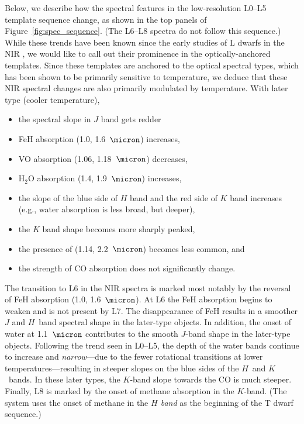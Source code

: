 \documentclass[12pt,preprint]{aastex}
\begin{document}
Below, we describe how the spectral features in the low-resolution L0--L5 template sequence change, as shown in the top panels of Figure~\ref{fig:spec_sequence}. (The L6--L8 spectra do not follow this sequence.)
While these trends have been known since the early studies of L dwarfs in the NIR \citep{Testi01,Reid01_NIR,Geballe02}, we would like to call out their prominence in the optically-anchored templates.
Since these templates are anchored to the optical spectral types, which has been shown to be primarily sensitive to temperature, we deduce that these NIR spectral changes are also primarily modulated by temperature.
With later type (cooler temperature), 
\begin{itemize}
\item the spectral slope in $J$ band gets redder 
\item FeH absorption (1.0, 1.6~$\micron$) increases,
\item VO absorption (1.06, 1.18~$\micron$) decreases,
\item H$_2$O absorption (1.4, 1.9~$\micron$) increases,
\item the slope of the blue side of $H$ band and the red side of $K$ band increases (e.g., water absorption is less broad, but deeper), 
\item the $K$ band shape becomes more sharply peaked,
\item the presence of  (1.14, 2.2~$\micron$) becomes less common, and
\item the strength of CO absorption does not significantly change.
\end{itemize}

The transition to L6 in the NIR spectra is marked most notably by the reversal of FeH absorption (1.0, 1.6~$\micron$). 
At L6 the FeH absorption begins to weaken and is not present by L7. 
The disappearance of FeH results in a smoother $J$ and $H$~band spectral shape in the later-type objects. In addition, the onset of water at 1.1~$\micron$ contributes to the smooth $J$-band shape in the later-type objects. Following the trend seen in L0--L5, the depth of the water bands continue to increase and \emph{narrow}---due to the fewer rotational transitions at lower temperatures---resulting in steeper slopes on the blue sides of the $H$~and $K$~bands. 
In these later types, the $K$-band slope towards the CO is much steeper. 
Finally, L8 is marked by the onset of methane absorption in the $K$-band. 
(The \citet{Geballe02} system uses the onset of methane in the \emph{$H$ band} as the beginning of the T dwarf sequence.) 
\end{document}
